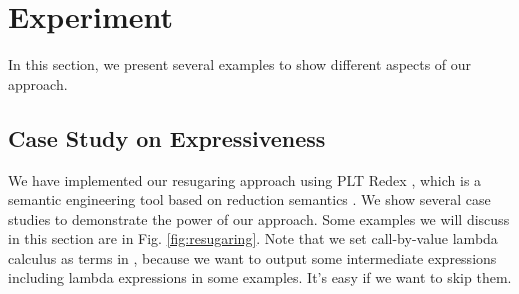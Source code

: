 \section{Experiment}
\label{sec4}

In this section, we present several examples to show different aspects of our approach.

\subsection{Case Study on Expressiveness}

We have implemented our resugaring approach using PLT Redex \cite{SEwPR}, which is a semantic engineering tool based on reduction semantics \cite{reduction}. We show several case studies to demonstrate the power of our approach. Some examples we will discuss in this section are in Fig.  \ref{fig:resugaring}. Note that we set call-by-value lambda calculus as terms in , because we want to output some intermediate expressions including lambda expressions in some examples. It's easy if we want to skip them.

